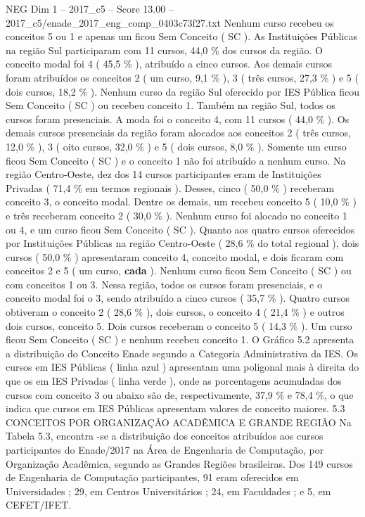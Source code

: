 \begin{textsample}{NEG Dim 1 – 2017\_c5 – Score 13.00 – 2017\_c5/enade\_2017\_eng\_comp\_0403c73f27.txt}
Nenhum curso recebeu os conceitos 5 ou 1 e apenas um ficou Sem Conceito ( SC ).
As Instituições Públicas na região Sul participaram com 11 cursos, 44,0 \% dos cursos da região.
O conceito modal foi 4 ( 45,5 \% ), atribuído a cinco cursos.
Aos demais cursos foram atribuídos os conceitos 2 ( um curso, 9,1 \% ), 3 ( três cursos, 27,3 \% ) e 5 ( dois cursos, 18,2 \% ).
Nenhum curso da região Sul oferecido por IES Pública ficou Sem Conceito ( SC ) ou recebeu conceito 1.
Também na região Sul, todos os cursos foram presenciais.
A moda foi o conceito 4, com 11 cursos ( 44,0 \% ).
Os demais cursos presenciais da região foram alocados aos conceitos 2 ( três cursos, 12,0 \% ), 3 ( oito cursos, 32,0 \% ) e 5 ( dois cursos, 8,0 \% ).
Somente um curso ficou Sem Conceito ( SC ) e o conceito 1 não foi atribuído a nenhum curso.
Na região Centro-Oeste, dez dos 14 cursos participantes eram de Instituições Privadas ( 71,4 \% em termos regionais ).
Desses, cinco ( 50,0 \% ) receberam conceito 3, o conceito modal.
Dentre os demais, um recebeu conceito 5 ( 10,0 \% ) e três receberam conceito 2 ( 30,0 \% ).
Nenhum curso foi alocado no conceito 1 ou 4, e um curso ficou Sem Conceito ( SC ).
Quanto aos quatro cursos oferecidos por Instituições Públicas na região Centro-Oeste ( 28,6 \% do total regional ), dois cursos ( 50,0 \% ) apresentaram conceito 4, conceito modal, e dois ficaram com conceitos 2 e 5 ( um curso, \textbf{cada} ).
Nenhum curso ficou Sem Conceito ( SC ) ou com conceitos 1 ou 3.
Nessa região, todos os cursos foram presenciais, e o conceito modal foi o 3, sendo atribuído a cinco cursos ( 35,7 \% ).
Quatro cursos obtiveram o conceito 2 ( 28,6 \% ), dois cursos, o conceito 4 ( 21,4 \% ) e outros dois cursos, conceito 5.
Dois cursos receberam o conceito 5 ( 14,3 \% ).
Um curso ficou Sem Conceito ( SC ) e nenhum recebeu conceito 1.
O Gráfico 5.2 apresenta a distribuição do Conceito Enade segundo a Categoria Administrativa da IES.
Os cursos em IES Públicas ( linha azul ) apresentam uma poligonal mais à direita do que os em IES Privadas ( linha verde ), onde as porcentagens acumuladas dos cursos com conceito 3 ou abaixo são de, respectivamente, 37,9 \% e 78,4 \%, o que indica que cursos em IES Públicas apresentam valores de conceito maiores. 5.3 CONCEITOS POR ORGANIZAÇÃO ACADÊMICA E GRANDE REGIÃO Na Tabela 5.3, encontra -se a distribuição dos conceitos atribuídos aos cursos participantes do Enade/2017 na Área de Engenharia de Computação, por Organização Acadêmica, segundo as Grandes Regiões brasileiras.
Dos 149 cursos de Engenharia de Computação participantes, 91 eram oferecidos em Universidades ; 29, em Centros Universitários ; 24, em Faculdades ; e 5, em CEFET/IFET.

\end{textsample}
